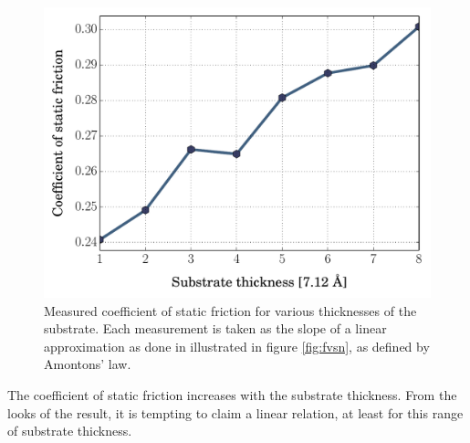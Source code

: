 \documentclass[twoside,english]{uiofysmaster}
\begin{document}
\begin{figure}
\centering
\hspace{-5mm}
\includegraphics[width=0.7\linewidth]{figures/friction/coefficientVsIndentation2}
\caption{Measured coefficient of static friction for various thicknesses of the substrate. 
	Each measurement is taken as the slope of a linear approximation as done in illustrated in figure \ref{fig:fvsn}, as defined by Amontons' law. }
\label{fig:coefficientVsIndentation2}
\end{figure}
The coefficient of static friction increases with the substrate thickness.
From the looks of the result, it is tempting to claim a linear relation, at least for this range of substrate thickness. 


 
\end{document}
